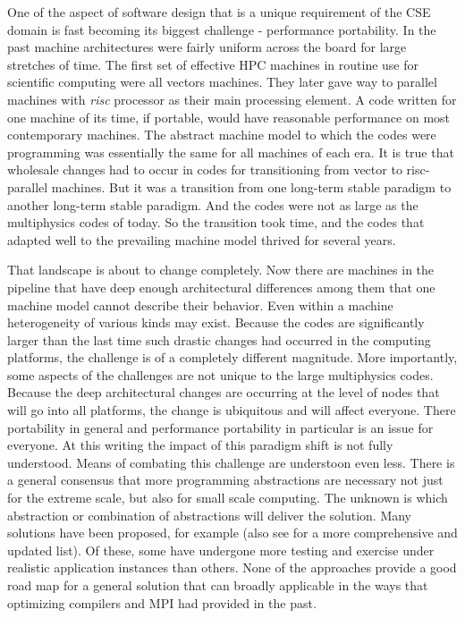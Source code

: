 \label{sec:future}

One of the aspect of software design that is a unique requirement of
the CSE domain is fast becoming its biggest challenge - performance
portability. In the past machine architectures were fairly uniform
across the board for large stretches of time. The first set of
effective HPC machines in routine use for scientific computing were
all vectors machines. They later gave way to parallel machines with
{\em risc} processor as their main processing element. A code written
for one machine of its time, if portable, would have reasonable
performance on most contemporary machines. The abstract machine model
to which the codes were programming was essentially the same for all
machines of each era. It is true that wholesale changes had to occur
in codes for transitioning from vector to risc-parallel machines. But
it was a transition from one long-term stable paradigm to another
long-term stable paradigm. And the codes were not as large as the
multiphysics codes of today. So the transition took time, and the
codes that adapted well to the prevailing machine model thrived for
several years.  

That landscape is about to change completely. Now there are machines
in the pipeline that have deep enough architectural differences among
them that one machine model cannot describe their behavior. Even
within a machine heterogeneity of various kinds may exist. Because
the codes are significantly larger than the last time such drastic
changes had occurred in the computing platforms, the challenge is of a
completely different magnitude. More importantly, some aspects of the
challenges are not unique to the large multiphysics codes. Because the
deep architectural changes are occurring at the level of nodes that
will go into all platforms, the change is ubiquitous and will
affect everyone. There portability in general and performance
portability in particular is an issue for everyone. At this writing
the impact of this paradigm shift is not fully understood. Means of
combating this challenge are understoon even less. There is a general
consensus that more programming abstractions are necessary not just
for the extreme scale, but also for small scale computing. The unknown
is which abstraction or combination of abstractions will deliver the
solution. Many solutions have been proposed, for example \cite{} (also
see \cite{IDEAS Howtos} for a more comprehensive and updated
list). Of these, some have undergone more testing and exercise under
realistic application instances than others. None of the approaches
provide a good road map for a general solution that can broadly
applicable in the ways that optimizing compilers and MPI had provided
in the past.